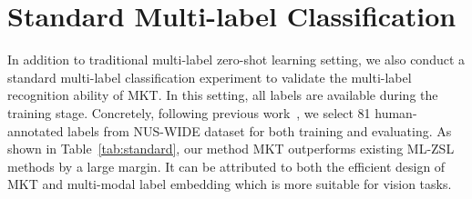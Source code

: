 \documentclass[letterpaper]{article} \usepackage{aaai23}  \usepackage{times}  \usepackage{helvet}  \usepackage{courier}  \usepackage[hyphens]{url}  \usepackage{graphicx} \urlstyle{rm} \def\UrlFont{\rm}  \usepackage{natbib}  \usepackage{caption} \frenchspacing  \setlength{\pdfpagewidth}{8.5in}  \setlength{\pdfpageheight}{11in}
\begin{document}
\section{Standard Multi-label Classification}
\label{standard}
In addition to traditional multi-label zero-shot learning setting, we also conduct a standard multi-label classification experiment to validate the multi-label recognition ability of MKT.
In this setting, all labels are available during the training stage.
Concretely, following previous work~\cite{biam}, we select 81 human-annotated labels from NUS-WIDE dataset for both training and evaluating.
As shown in Table~\ref{tab:standard}, our method MKT outperforms existing ML-ZSL methods by a large margin. 
It can be attributed to both the efficient design of MKT and multi-modal label embedding which is more suitable for vision tasks.
\begin{table}[t]
\centering
\caption{Comparison for the standard multi-label classification on NUS-WIDE. Results are reported in terms of mAP, as well as precision (P), recall (R), and F1 score. 
}
\end{table}
\end{document}
